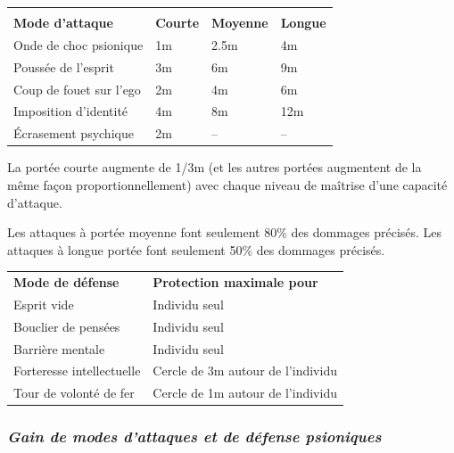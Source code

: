 \documentclass[11pt]{article}
\begin{document}
{\bigskip

\begin{tabular}{p{5cm} >{\centering\arraybackslash}p{2.5cm}>{\centering\arraybackslash}p{2.5cm}>{\centering\arraybackslash}p{2.5cm}}
&\multicolumn{3}{c}{\textbf{Portée}} \\
\textbf{Mode d'attaque} & \textbf{Courte} & \textbf{Moyenne} & \textbf{Longue} \\
Onde de choc psionique  & 1m & 2.5m & 4m \\
Poussée de l'esprit     & 3m & 6m   & 9m \\
Coup de fouet sur l'ego & 2m & 4m   & 6m \\
Imposition d'identité   & 4m & 8m   & 12m \\
Écrasement psychique    & 2m & --   & -- \\
\end{tabular}

\medskip


La portée courte augmente de 1/3m (et les autres portées augmentent de la même façon proportionnellement) avec chaque niveau de maîtrise d'une capacité d'attaque.

\medskip

Les attaques à portée moyenne font seulement 80\% des dommages précisés. Les attaques à longue portée font seulement 50\% des dommages précisés.

\bigskip

\begin{tabular}{p{7.5cm}p{6cm}}
\textbf{Mode de défense} & \textbf{Protection maximale pour} \\
Esprit vide & Individu seul \\
Bouclier de pensées & Individu seul \\
Barrière mentale & Individu seul \\
Forteresse intellectuelle & Cercle de 3m autour de l'individu \\
Tour de volonté de fer & Cercle de 1m autour de l'individu \\
\end{tabular}

\bigskip




\subsubsection*{\textit{Gain de modes d'attaques et de défense psioniques}}

}
\end{document}
